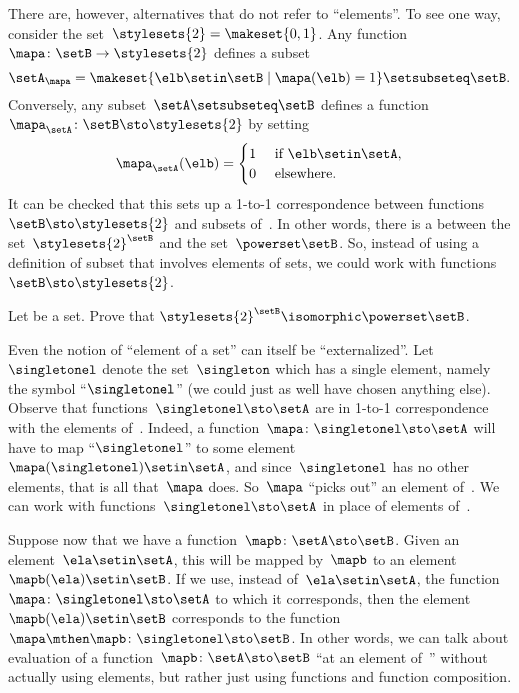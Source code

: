 There are, however, alternatives that do not refer to ``elements''.
To see one way, consider the set~$\stylesets{2} = \makeset{ 0, 1}$.
Any function~$\mapa \colon \setB \to \stylesets{2}$ defines a subset
\begin{equation}
    \setA_\mapa = \makeset{ \elb \setin\setB \mid \mapa(\elb) = 1 } \setsubseteq \setB.
\end{equation}
Conversely, any subset~$\setA \setsubseteq \setB$ defines a function~$\mapa_\setA \colon \setB \sto \stylesets{2}$ by setting
\begin{equation}
    \mapa_\setA(\elb) = \begin{cases}
        1 & \text{ if }\elb\setin\setA, \\
        0 & \text{ elsewhere}.
    \end{cases}
\end{equation}
It can be checked that this sets up a 1-to-1 correspondence between functions~$\setB \sto \stylesets{2}$ and subsets of~\setB.
In other words, there is a  between the set~$\stylesets{2}^\setB$ and the set~$\powerset \setB$.
So, instead of using a definition of subset that involves elements of sets, we could work with functions~$\setB \sto \stylesets{2}$.

\begin{gradedexercise}
    \label{ex:SubsetsAsFunctions}

    Let \setB be a set.
    Prove that $\stylesets{2}^\setB \isomorphic \powerset \setB$.
\end{gradedexercise}


Even the notion of ``element of a set'' can itself be ``externalized''.
Let~$\singletonel$ denote the set~$\singleton$ which has a single element, namely the symbol ``$\singletonel$'' (we could just as well have chosen anything else).
Observe that functions~$\singletonel \sto \setA$ are in 1-to-1 correspondence with the elements of~\setA.
Indeed, a function~$\mapa\colon \singletonel \sto \setA$ will have to map ``$\singletonel$'' to some element~$\mapa(\singletonel) \setin\setA$, and since~$\singletonel$ has no other elements, that is all that~$\mapa$ does.
So~$\mapa$ ``picks out'' an element of~\setA.
We can work with functions~$\singletonel \sto \setA$ in place of elements of~\setA.

Suppose now that we have a function~$\mapb \colon \setA \sto \setB$.
Given an element~$\ela \setin\setA$, this will be mapped by~$\mapb$ to an element~$\mapb(\ela) \setin\setB$.
If we use, instead of~$\ela \setin\setA$, the function~$\mapa \colon \singletonel \sto \setA$ to which it corresponds, then the element~$\mapb(\ela) \setin\setB$ corresponds to the function~$\mapa \mthen \mapb\colon \singletonel \sto \setB$.
In other words, we can talk about evaluation of a function~$\mapb \colon \setA \sto \setB$ ``at an element of~\setA'' without actually using elements, but rather just using functions and function composition.

